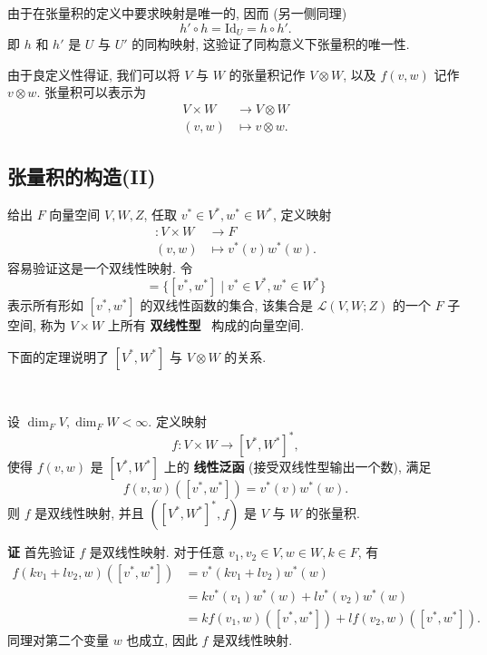 由于在张量积的定义中要求映射是唯一的, 因而 (另一侧同理)
\begin{equation*}
    h' \circ h = \text{Id}_U = h \circ h'.
\end{equation*}
即 $h$ 和 $h'$ 是 $U$ 与 $U'$ 的同构映射, 这验证了同构意义下张量积的唯一性.

由于良定义性得证, 我们可以将 $V$ 与 $W$ 的张量积记作 $V \otimes W$, 以及 $f(v,w)$ 记作 $v \otimes w$. 张量积可以表示为
\begin{align*}
    V \times W &\to V \otimes W \\
    (v,w) &\mapsto v \otimes w.
\end{align*}

\subsection{张量积的构造(II)}
 
给出 $F$ 向量空间 $V,W,Z$, 任取 $v^* \in V^*,w^* \in W^*$, 定义映射
\begin{align*}
    [v^*, w^*]: V \times W &\to F \\
    (v,w) &\mapsto v^*(v)w^*(w).
\end{align*}
容易验证这是一个双线性映射. 令
\begin{equation*}
    [V^*, W^*] = \{[v^*, w^*] \mid v^* \in V^*, w^* \in W^*\}
\end{equation*}
表示所有形如 $[v^*,w^*]$ 的双线性函数的集合, 该集合是 $\mathcal{L} (V,W;Z)$ 的一个 $F$ 子空间, 称为 $V \times W$ 上所有 \textbf{双线性型} \ 构成的向量空间. 

下面的定理说明了 $[V^*,W^*]$ 与 $V \otimes W$ 的关系.

\vspace{0.6em}

\begin{theorem}
    \

    设 $\dim_F{V}, \dim_F{W}<\infty$. 定义映射
    \begin{equation*}
        f: V \times W \to [V^*, W^*]^*,
    \end{equation*}
    使得 $f(v,w)$ 是 $[V^*, W^*]$ 上的 \textbf{线性泛函} (接受双线性型输出一个数), 满足
    \begin{equation*}
        f(v,w)([v^*,w^*]) = v^*(v)w^*(w).
    \end{equation*}
    则 $f$ 是双线性映射, 并且 $([V^*,W^*]^*,f)$ 是 $V$ 与 $W$ 的张量积.
\end{theorem}

\hspace{-2em}\textbf{证} \hspace{0.5em} 首先验证 $f$ 是双线性映射. 对于任意 $v_1,v_2 \in V, w \in W, k \in F$, 有
\begin{align*}
    f(kv_1 + lv_2, w)([v^*,w^*]) &= v^*(kv_1 + lv_2)w^*(w) \\
    &= k v^*(v_1)w^*(w) + l v^*(v_2)w^*(w) \\
    &= k f(v_1,w)([v^*,w^*]) + l f(v_2,w)([v^*,w^*]).
\end{align*}
同理对第二个变量 $w$ 也成立, 因此 $f$ 是双线性映射.

